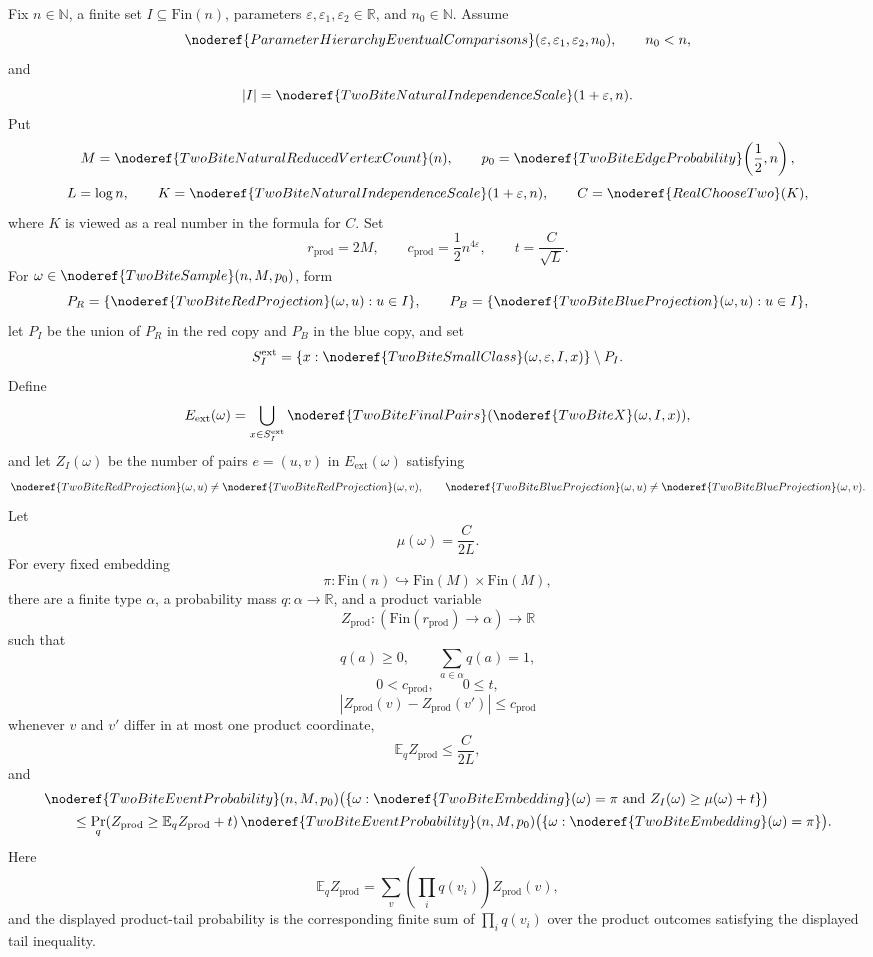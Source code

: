 \begin{helper}
Fix \(n\in\mathbb N\), a finite set \(I\subseteq\mathrm{Fin}(n)\), parameters
\(\varepsilon,\varepsilon_1,\varepsilon_2\in\mathbb R\), and \(n_0\in\mathbb N\).
Assume
\[
\noderef{ParameterHierarchyEventualComparisons}
  (\varepsilon,\varepsilon_1,\varepsilon_2,n_0),\qquad n_0<n,
\]
and
\[
|I|=\noderef{TwoBiteNaturalIndependenceScale}(1+\varepsilon,n).
\]
Put
\[
M=\noderef{TwoBiteNaturalReducedVertexCount}(n),\qquad
p_0=\noderef{TwoBiteEdgeProbability}\!\left(\frac12,n\right),
\]
\[
L=\log n,\qquad
K=\noderef{TwoBiteNaturalIndependenceScale}(1+\varepsilon,n),
\qquad
C=\noderef{RealChooseTwo}(K),
\]
where \(K\) is viewed as a real number in the formula for \(C\).  Set
\[
r_{\mathrm{prod}}=2M,\qquad
c_{\mathrm{prod}}=\frac12 n^{4\varepsilon},\qquad
t=\frac{C}{\sqrt L}.
\]
For \(\omega\in\noderef{TwoBiteSample}(n,M,p_0)\), form
\[
P_R=\{\noderef{TwoBiteRedProjection}(\omega,u):u\in I\},\qquad
P_B=\{\noderef{TwoBiteBlueProjection}(\omega,u):u\in I\},
\]
let \(P_I\) be the union of \(P_R\) in the red copy and \(P_B\) in the blue
copy, and set
\[
S_I^{\mathrm{ext}}
=\{x:\noderef{TwoBiteSmallClass}(\omega,\varepsilon,I,x)\}\setminus P_I.
\]
Define
\[
E_{\mathrm{ext}}(\omega)
=
\bigcup_{x\in S_I^{\mathrm{ext}}}
  \noderef{TwoBiteFinalPairs}(\noderef{TwoBiteX}(\omega,I,x)),
\]
and let \(Z_I(\omega)\) be the number of pairs \(e=(u,v)\) in
\(E_{\mathrm{ext}}(\omega)\) satisfying
\[
\noderef{TwoBiteRedProjection}(\omega,u)
  \ne\noderef{TwoBiteRedProjection}(\omega,v),\qquad
\noderef{TwoBiteBlueProjection}(\omega,u)
  \ne\noderef{TwoBiteBlueProjection}(\omega,v).
\]
Let
\[
\mu(\omega)=\frac{C}{2L}.
\]
For every fixed embedding
\[
\pi:\mathrm{Fin}(n)\hookrightarrow\mathrm{Fin}(M)\times\mathrm{Fin}(M),
\]
there are a finite type \(\alpha\), a probability mass \(q:\alpha\to\mathbb R\),
and a product variable
\[
Z_{\mathrm{prod}}:(\mathrm{Fin}(r_{\mathrm{prod}})\to\alpha)\to\mathbb R
\]
such that
\[
q(a)\ge0,\qquad \sum_{a\in\alpha}q(a)=1,
\]
\[
0<c_{\mathrm{prod}},\qquad 0\le t,
\]
\[
\left|Z_{\mathrm{prod}}(v)-Z_{\mathrm{prod}}(v')\right|
\le c_{\mathrm{prod}}
\]
whenever \(v\) and \(v'\) differ in at most one product coordinate,
\[
\mathbb E_q Z_{\mathrm{prod}}\le \frac{C}{2L},
\]
and
\[
\begin{aligned}
&\noderef{TwoBiteEventProbability}(n,M,p_0)
 \bigl(\{\omega:\noderef{TwoBiteEmbedding}(\omega)=\pi
   \text{ and } Z_I(\omega)\ge \mu(\omega)+t\}\bigr)\\
&\qquad\le
\Pr_q\!\left(Z_{\mathrm{prod}}\ge \mathbb E_q Z_{\mathrm{prod}}+t\right)
\noderef{TwoBiteEventProbability}(n,M,p_0)
 \bigl(\{\omega:\noderef{TwoBiteEmbedding}(\omega)=\pi\}\bigr).
\end{aligned}
\]
Here
\[
\mathbb E_q Z_{\mathrm{prod}}
=
\sum_v\left(\prod_iq(v_i)\right)Z_{\mathrm{prod}}(v),
\]
and the displayed product-tail probability is the corresponding finite sum of
\(\prod_i q(v_i)\) over the product outcomes satisfying the displayed tail
inequality.
\end{helper}
